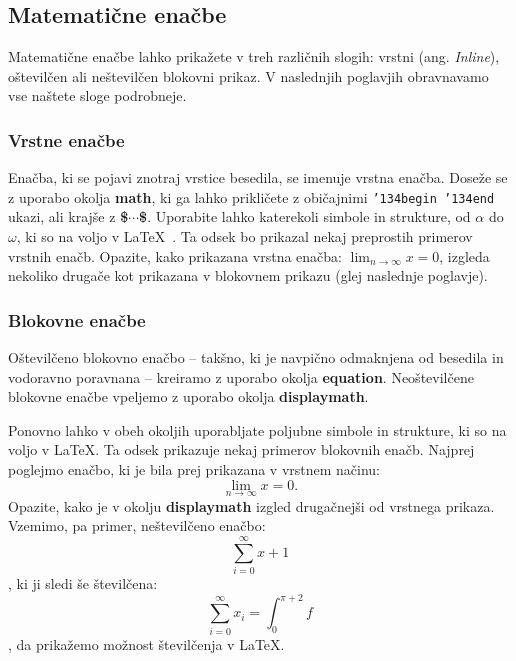 \documentclass[article,slovene]{stucosrec}
\newcommand{\latex}{\LaTeX\xspace}
\begin{document}
	\subsection{Matematične enačbe}
	
	Matematične enačbe lahko prikažete v treh različnih slogih: vrstni (ang. \textit{Inline}), oštevilčen ali neštevilčen blokovni prikaz.
	V naslednjih poglavjih obravnavamo vse naštete sloge podrobneje.
	
	\subsubsection{Vrstne enačbe}
	
	Enačba, ki se pojavi znotraj vrstice besedila, se imenuje vrstna enačba.
	Doseže se z uporabo okolja \textbf{math}, ki ga lahko prikličete z običajnimi \texttt{{\char'134}begin {\char'134}end} ukazi, ali krajše z \textbf{\$$\cdots$\$}.
	Uporabite lahko katerekoli simbole in strukture, od $\alpha$ do $\omega$, ki so na voljo v \latex~\cite{Lamport:LaTeX}. Ta odsek bo prikazal nekaj preprostih primerov vrstnih enačb.
	Opazite, kako prikazana vrstna enačba:
	\begin{math}\lim_{n\rightarrow \infty}x=0\end{math}, 
	izgleda nekoliko drugače kot prikazana v blokovnem prikazu (glej naslednje poglavje).

	
	\subsubsection{Blokovne enačbe}
	
	Oštevilčeno blokovno enačbo -- takšno, ki je navpično odmaknjena od besedila in vodoravno poravnana -- kreiramo z uporabo okolja \textbf{equation}.
	Neoštevilčene blokovne enačbe vpeljemo z uporabo okolja \textbf{displaymath}.

	Ponovno lahko v obeh okoljih uporabljate poljubne simbole in strukture, ki so na voljo v \latex. Ta odsek prikazuje nekaj primerov blokovnih enačb.
	Najprej poglejmo enačbo, ki je bila prej prikazana v vrstnem načinu: 
	\begin{equation}\lim_{n\rightarrow \infty}x=0.\end{equation}
	Opazite, kako je v okolju \textbf{displaymath} izgled drugačnejši od vrstnega prikaza.
	Vzemimo, pa primer, neštevilčeno enačbo:
	\begin{displaymath}\sum_{i=0}^{\infty} x + 1\end{displaymath},
	ki ji sledi še številčena: 
	\begin{equation}\sum_{i=0}^{\infty}x_i=\int_{0}^{\pi+2} f\end{equation},
	da prikažemo možnost številčenja v \latex.
	
\end{document}

